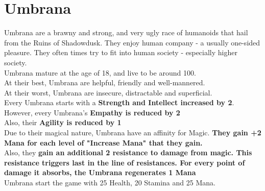 \section{Umbrana}\label{race:umbrana}
Umbrana are a brawny and strong, and very ugly race of humanoids that hail from the Ruins of Shadowdusk.
They enjoy human company - a usually one-sided pleasure.
They often times try to fit into human society - especially higher society.\\
Umbrana mature at the age of 18, and live to be around 100.\\
At their best, Umbrana are helpful, friendly and well-mannered.\\
At their worst, Umbrana are insecure, distractable and superficial.\\
Every Umbrana starts with a \textbf{Strength and Intellect increased by 2}.\\
However, every Umbrana's \textbf{Empathy is reduced by 2}\\
Also, their \textbf{Agility is reduced by 1}\\
Due to their magical nature, Umbrana have an affinity for Magic. \textbf{They gain +2 Mana for each level of "Increase Mana" that they gain.}\\
Also, they \textbf{gain an additional 2 resistance to damage from magic.
This resistance triggers last in the line of resistances.
For every point of damage it absorbs, the Umbrana regenerates 1 Mana}\\
Umbrana start the game with 25 Health, 20 Stamina and 25 Mana.